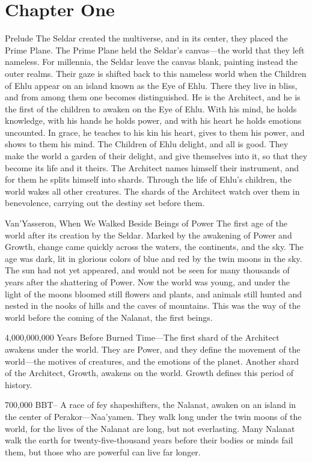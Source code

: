 \documentclass[smalldemyvopaper,11pt,twoside,onecolumn,openright,extrafontsizes]{memoir}
\begin{document}
\chapter{Chapter One}
Prelude
The Seldar created the multiverse, and in its center, they placed the Prime Plane. The Prime Plane held the Seldar’s canvas—the world that they left nameless. For millennia, the Seldar leave the canvas blank, painting instead the outer realms. Their gaze is shifted back to this nameless world when the Children of Ehlu appear on an island known as the Eye of Ehlu. There they live in bliss, and from among them one becomes distinguished. He is the Architect, and he is the first of the children to awaken on the Eye of Ehlu. With his mind, he holds knowledge, with his hands he holds power, and with his heart he holds emotions uncounted. In grace, he teaches to his kin his heart, gives to them his power, and shows to them his mind. The Children of Ehlu delight, and all is good. They make the world a garden of their delight, and give themselves into it, so that they become its life and it theirs. The Architect names himself their instrument, and for them he splits himself into shards. Through the life of Ehlu's children, the world wakes all other creatures. The shards of the Architect watch over them in benevolence, carrying out the destiny set before them.

Van’Yasseron, When We Walked Beside Beings of Power
The first age of the world after its creation by the Seldar. Marked by the awakening of Power and Growth, change came quickly across the waters, the continents, and the sky. The age was dark, lit in glorious colors of blue and red by the twin moons in the sky. The sun had not yet appeared, and would not be seen for many thousands of years after the shattering of Power. Now the world was young, and under the light of the moons bloomed still flowers and plants, and animals still hunted and nested in the nooks of hills and the caves of mountains. This was the way of the world before the coming of the Nalanat, the first beings.

4,000,000,000 Years Before Burned Time—The first shard of the Architect awakens under the world. They are Power, and they define the movement of the world—the motives of creatures, and the emotions of the planet. Another shard of the Architect, Growth, awakens on the world. Growth defines this period of history.

700,000 BBT-- A race of fey shapeshifters, the Nalanat, awaken on an island in the center of Perakor—Naa'yamen. They walk long under the twin moons of the world, for the lives of the Nalanat are long, but not everlasting. Many Nalanat walk the earth for twenty-five-thousand years before their bodies or minds fail them, but those who are powerful can live far longer.
\end{document}
